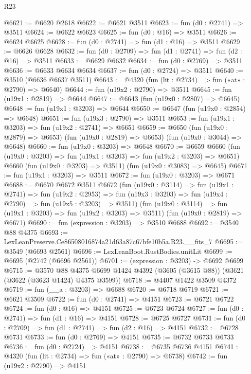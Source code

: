 \begin{lexlean}{R23}
\begin{coremodule}
@6621 := @6620 @2618
@6622 := @6621 @3511
@6623 := fun (d0 : @2741) => @3511
@6624 := @6622 @6623
@6625 := fun (d0 : @16) => @3511
@6626 := @6624 @6625
@6628 := fun (d0 : @2741) => fun (d1 : @16) => @3511
@6629 := @6626 @6628
@6632 := fun (d0 : @2709) => fun (d1 : @2741) => fun (d2 : @16) => @3511
@6633 := @6629 @6632
@6634 := fun (d0 : @2769) => @3511
@6636 := @6633 @6634 @6634
@6637 := fun (d0 : @2724) => @3511
@6640 := @3510 (@6636 @6637 @3511)
@6643 := @4320 (fun (lit : @2734) => fun («at» : @2790) => @6640)
@6644 := fun (u19x2 : @2790) => @3511
@6645 := fun (u19x1 : @2819) => @6644
@6647 := @6643 (fun (u19x0 : @2807) => @6645)
@6648 := fun (u19x1 : @3203) => @6644
@6650 := @6647 (fun (u19x0 : @2854) => @6648)
@6651 := fun (u19x3 : @2790) => @3511
@6653 := fun (u19x1 : @3203) => fun (u19x2 : @2741) => @6651
@6659 := @6650
    (fun (u19x0 : @2879) => @6653)
    (fun (u19x0 : @2819) => @6653)
    (fun (u19x0 : @3044) => @6648)
@6660 := fun (u19x0 : @3203) => @6648
@6670 := @6659
    @6660
    (fun (u19x0 : @3203) => fun (u19x1 : @3203) => fun (u19x2 : @3203) => @6651)
    @6660
    (fun (u19x0 : @3203) => @3511)
    (fun (u19x0 : @3083) => @6645)
@6671 := fun (u19x1 : @3203) => @3511
@6672 := fun (u19x0 : @3203) => @6671
@6688 := @6670
    @6672
    @3511
    @6672
    (fun (u19x0 : @3114) =>
    fun (u19x1 : @2741) =>
    fun (u19x2 : @2953) =>
    fun (u19x3 : @3203) => fun (u19x4 : @2790) => fun (u19x5 : @3203) => @3511)
    (fun (u19x0 : @3114) => fun (u19x1 : @3203) => fun (u19x2 : @3203) => @3511)
    (fun (u19x0 : @2819) => @6671)
@6690 := fun (expression : @3203) => @3510 @6688
@6692 := @3540 @88 @4375
@6693 := LexLeanPreserve.Ce86508016874a21d63a87c67bfe10b5a.R23.__fits_7
@6695 := @3549 (@6693 @2561)
@6696 := LexLeanBoot.RustBodies.unitLit
@6699 := @6695 (@2742 (@6696 @2561))
@6701 := (expression : @3203) -> @6692 @6699
@6715 := @3570
    @88
    @4375
    @6699
    @1424
    @4392
    (@3605 (@3615 @88))
    (@3621 (@3622 (@3623 @1424) @4375 @3599))
@6718 := @4407 @1422 @3509 @4372
@6719 := fun (__a : @3203) => @6688
@6720 := @6718 @6719
@6721 := @6621 @3509
@6722 := fun (d0 : @2741) => @4151
@6723 := @6721 @6722
@6724 := fun (d0 : @16) => @4151
@6725 := @6723 @6724
@6727 := fun (d0 : @2741) => fun (d1 : @16) => @4151
@6728 := @6725 @6727
@6731 := fun (d0 : @2709) => fun (d1 : @2741) => fun (d2 : @16) => @4151
@6732 := @6728 @6731
@6733 := fun (d0 : @2769) => @4151
@6735 := @6732 @6733 @6733
@6736 := fun (d0 : @2724) => @4151
@6738 := @6735 @6736 @4151
@6741 := @4320 (fun (lit : @2734) => fun («at» : @2790) => @6738)
@6742 := fun (u19x2 : @2790) => @4151

\end{coremodule}
\end{lexlean}
